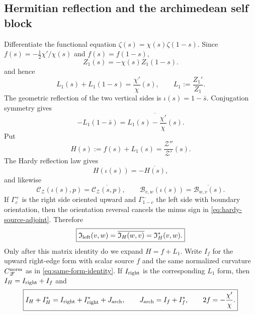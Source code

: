 \subsection{Hermitian reflection and the archimedean self block}
Differentiate the functional equation $\zeta(s)=\chi(s)\zeta(1-s)$. Since
$f(s)=-\frac12\chi'/\chi(s)$ and $f(s)=f(1-s)$,
\begin{equation}
\boxed{Z_1(s)=-\chi(s)Z_1(1-s).}
\label{eq:Z1-FE}
\end{equation}
and hence
\begin{equation}
\boxed{
L_1(s)+L_1(1-s)=\frac{\chi'}{\chi}(s),
\qquad L_1:=\frac{Z_1'}{Z_1}.
}
\label{eq:Z1-log-FE}
\end{equation}
The geometric reflection of the two vertical sides is
$\iota(s)=1-\bar s$.  Conjugation symmetry gives
\begin{equation}
\boxed{
-L_1(1-\bar s)
=\overline{L_1(s)-\frac{\chi'}{\chi}(s)}.
}
\label{eq:L1-hermitian-reflection}
\end{equation}
Put
\[
H(s):=f(s)+L_1(s)=\frac{\mathscr Z''}{\mathscr Z'}(s).
\]
The Hardy reflection law gives
\begin{equation}
\boxed{H(\iota(s))=-\overline{H(s)},}
\label{eq:hardy-source-adjoint}
\end{equation}
and likewise
\begin{equation}
\boxed{
\mathcal C_{\mathscr Z}(\iota(s),p)
=\overline{\mathcal C_{\mathscr Z}(s,p)},
\qquad
\mathcal B_{v,w}(\iota(s))
=\overline{\mathcal B_{w,v}(s)}.
}
\label{eq:curvature-packet-adjoint}
\end{equation}
If $\Gamma_c^+$ is the right side oriented upward and
$\Gamma_{1-c}^-$ the left side with boundary orientation, then the orientation
reversal cancels the minus sign in \eqref{eq:hardy-source-adjoint}. Therefore
\begin{equation}
\boxed{
\mathfrak I_{\rm left}(v,w)
=\overline{\mathfrak I_H(w,v)}
=\mathfrak I_H^*(v,w).
}
\label{eq:right-left-matrix-adjoint}
\end{equation}
Only after this matrix identity do we expand $H=f+L_1$.  Write $I_f$ for the
upward right-edge form with scalar source $f$ and the same normalized curvature
$C_{\mathscr Z}^{\rm norm}$ as in \eqref{eq:same-form-identity}. If $I_{\rm right}$
is the corresponding $L_1$ form, then $I_H=I_{\rm right}+I_f$ and
\begin{equation}
\boxed{
I_H+I_H^*=I_{\rm right}+I_{\rm right}^*+J_{\rm arch},
\qquad
J_{\rm arch}=I_f+I_f^*,
\qquad
2f=-\frac{\chi'}{\chi}.
}
\label{eq:J-I-source-split}
\end{equation}

